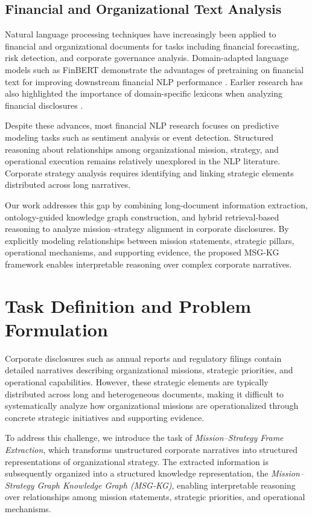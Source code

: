 \documentclass[11pt]{article}
\begin{document}
\subsection{Financial and Organizational Text Analysis}

Natural language processing techniques have increasingly been applied to financial and organizational documents for tasks including financial forecasting, risk detection, and corporate governance analysis. Domain-adapted language models such as FinBERT demonstrate the advantages of pretraining on financial text for improving downstream financial NLP performance \cite{araci2019finbert}. Earlier research has also highlighted the importance of domain-specific lexicons when analyzing financial disclosures \cite{loughran2011liability}.

Despite these advances, most financial NLP research focuses on predictive modeling tasks such as sentiment analysis or event detection. Structured reasoning about relationships among organizational mission, strategy, and operational execution remains relatively unexplored in the NLP literature. Corporate strategy analysis requires identifying and linking strategic elements distributed across long narratives.

Our work addresses this gap by combining long-document information extraction, ontology-guided knowledge graph construction, and hybrid retrieval-based reasoning to analyze mission–strategy alignment in corporate disclosures. By explicitly modeling relationships between mission statements, strategic pillars, operational mechanisms, and supporting evidence, the proposed MSG-KG framework enables interpretable reasoning over complex corporate narratives.

\section{Task Definition and Problem Formulation}
\label{sec:task_definition}

Corporate disclosures such as annual reports and regulatory filings contain detailed narratives describing organizational missions, strategic priorities, and operational capabilities. However, these strategic elements are typically distributed across long and heterogeneous documents, making it difficult to systematically analyze how organizational missions are operationalized through concrete strategic initiatives and supporting evidence.

To address this challenge, we introduce the task of \textit{Mission--Strategy Frame Extraction}, which transforms unstructured corporate narratives into structured representations of organizational strategy. The extracted information is subsequently organized into a structured knowledge representation, the \textit{Mission--Strategy Graph Knowledge Graph (MSG-KG)}, enabling interpretable reasoning over relationships among mission statements, strategic priorities, and operational mechanisms.
\end{document}
